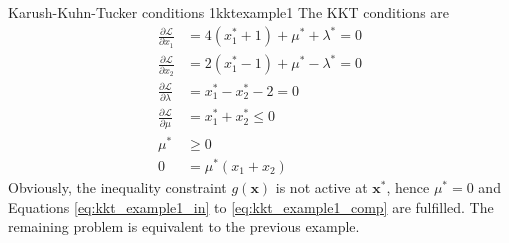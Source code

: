 \begin{example}{Karush-Kuhn-Tucker conditions 1}{kktexample1}
    The KKT conditions are 
    \begin{align}
        \frac{\partial \mathcal{\mathcal{L}}}{\partial x_1} &= 4 (x_1^* + 1) + \mu^* + \lambda^*  = 0\\
        \frac{\partial \mathcal{\mathcal{L}}}{\partial x_2} &= 2 (x_1^* - 1) + \mu^* - \lambda^*  = 0\\
        \frac{\partial \mathcal{\mathcal{L}}}{\partial \lambda} &= x_1^* - x_2^* - 2 = 0 \\
        \label{eq:kkt_example1_in}
        \frac{\partial \mathcal{\mathcal{L}}}{\partial \mu} &= x_1^*+x_2^* \le 0 \\
        \mu^* &\ge 0 \\
        0 &= \mu^*(x_1+x_2)
        \label{eq:kkt_example1_comp}
    \end{align}
    Obviously, the inequality constraint $g(\mathbf{x})$ is not active at $\mathbf{x}^*$, hence $\mu^*=0$ and Equations \eqref{eq:kkt_example1_in} to \eqref{eq:kkt_example1_comp} are fulfilled. The remaining problem is equivalent to the previous example.
\end{example}

